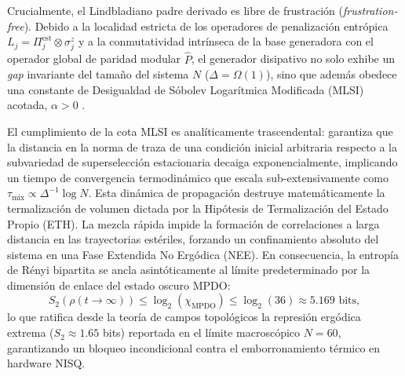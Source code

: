 \documentclass[12pt,a4paper]{article}
\theoremstyle{plain}
\theoremstyle{definition}
\theoremstyle{remark}
\begin{document}
Crucialmente, el Lindbladiano padre derivado es libre de frustración (\textit{frustration-free}). Debido a la localidad estricta de los operadores de penalización entrópica $L_j = \Pi_j^{\text{est}} \otimes \sigma_j^z$ y a la conmutatividad intrínseca de la base generadora con el operador global de paridad modular $\hat{P}$, el generador disipativo no solo exhibe un \textit{gap} invariante del tamaño del sistema $N$ ($\Delta = \Omega(1)$), sino que además obedece una constante de Desigualdad de Sóbolev Logarítmica Modificada (MLSI) acotada, $\alpha > 0$ \cite{Kastoryano2013}.

El cumplimiento de la cota MLSI es analíticamente trascendental: garantiza que la distancia en la norma de traza de una condición inicial arbitraria respecto a la subvariedad de superselección estacionaria decaiga exponencialmente, implicando un tiempo de convergencia termodinámico que escala sub-extensivamente como $\tau_{\text{mix}} \propto \Delta^{-1} \log N$.
Esta dinámica de propagación destruye matemáticamente la termalización de volumen dictada por la Hipótesis de Termalización del Estado Propio (ETH). La mezcla rápida impide la formación de correlaciones a larga distancia en las trayectorias estériles, forzando un confinamiento absoluto del sistema en una Fase Extendida No Ergódica (NEE). En consecuencia, la entropía de Rényi bipartita se ancla asintóticamente al límite predeterminado por la dimensión de enlace del estado oscuro MPDO:
\begin{equation}
S_2(\rho(t \to \infty)) \le \log_2(\chi_{\text{MPDO}}) \le \log_2(36) \approx 5.169 \text{ bits},
\end{equation}
lo que ratifica desde la teoría de campos topológicos la represión ergódica extrema ($S_2 \approx 1.65$ bits) reportada en el límite macroscópico $N=60$, garantizando un bloqueo incondicional contra el emborronamiento térmico en hardware NISQ.
\end{document}
